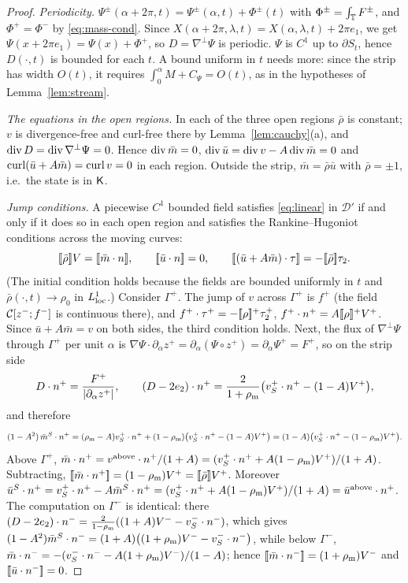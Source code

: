 \begin{proof}
\emph{Periodicity.} $\Psi^\pm(\alpha+2\pi,t)=\Psi^\pm(\alpha,t)+\Phi^\pm(t)$ with $\Phi^\pm=\int_{\mathbb{T}} F^\pm$, and $\Phi^+=\Phi^-$ by \eqref{eq:mass-cond}. Since $X(\alpha+2\pi,\lambda,t)=X(\alpha,\lambda,t)+2\pi e_1$, we get
$\Psi(x+2\pi e_1)=\Psi(x)+\Phi^+$, so $D=\nabla^\perp\Psi$ is periodic. $\Psi$ is $C^1$ up to $\partial S_t$, hence $D(\cdot,t)$ is bounded for each $t$. A bound uniform in
$t$ needs more: since the strip has width $O(t)$, it requires $\int_0^\alpha M+C_\Psi=O(t)$, as in the hypotheses of Lemma~\ref{lem:stream}.

\emph{The equations in the open regions.} In each of the three open regions $\bar\rho$ is constant; $v$ is divergence-free and curl-free there by Lemma~\ref{lem:cauchy}(a), and $\operatorname{div} D=\operatorname{div}\nabla^\perp\Psi=0$.
Hence $\operatorname{div}\bar m=0$, $\operatorname{div}\bar u=\operatorname{div} v-A\operatorname{div}\bar m=0$ and $\operatorname{curl}(\bar u+A\bar m)=\operatorname{curl} v=0$ in each region. Outside the strip, $\bar m=\bar\rho\bar u$ with $\bar\rho=\pm1$, i.e.\ the state is in $\mathsf{K}$.

\emph{Jump conditions.} A piecewise $C^1$ bounded field satisfies \eqref{eq:linear} in $\mathcal D'$ if and only if it does so in each open region and satisfies the Rankine--Hugoniot conditions across the moving curves:
\[
\jump{\bar\rho}V=\jump{\bar m\cdot n},\qquad \jump{\bar u\cdot n}=0,\qquad \jump{(\bar u+A\bar m)\cdot\tau}=-\jump{\bar\rho}\tau_2 .
\]
(The initial condition holds because the fields are bounded uniformly in $t$ and $\bar\rho(\cdot,t)\to\rho_0$ in $L^1_{\rm loc}$.) Consider $\Gamma^+$. The jump of $v$ across $\Gamma^+$ is $f^+$ (the field $\mathcal{C}[z^-;f^-]$ is
continuous there), and $f^+\cdot\tau^+=-[\![\rho]\!]^+\tau_2^+$, $f^+\cdot n^+=A[\![\rho]\!]^+V^+$. Since $\bar u+A\bar m=v$ on both sides, the third condition holds. Next, the flux of $\nabla^\perp\Psi$ through
$\Gamma^+$ per unit $\alpha$ is $\nabla\Psi\cdot\partial_\alpha z^+=\partial_\alpha(\Psi\circ z^+)=\partial_\alpha\Psi^+=F^+$, so on the strip side
\[
D\cdot n^+=\frac{F^+}{|\partial_\alpha z^+|},\qquad (D-2e_2)\cdot n^+=\frac{2}{1+\rho_{\mathrm m}}\big(v_S^+\cdot n^+-(1-A)V^+\big),
\]
and therefore
\[
(1-A^2)\,\bar m^{S}\cdot n^+=(\rho_{\mathrm m}-A)v_S^+\cdot n^++(1-\rho_{\mathrm m})\big(v_S^+\cdot n^+-(1-A)V^+\big)=(1-A)\big(v_S^+\cdot n^+-(1-\rho_{\mathrm m})V^+\big).
\]
Above $\Gamma^+$, $\bar m\cdot n^+=v^{\rm above}\cdot n^+/(1+A)=(v_S^+\cdot n^++A(1-\rho_{\mathrm m})V^+)/(1+A)$. Subtracting, $[\![\bar m\cdot n^+]\!]=(1-\rho_{\mathrm m})V^+=[\![\bar\rho]\!]V^+$. Moreover
$\bar u^S\cdot n^+=v_S^+\cdot n^+-A\bar m^S\cdot n^+=(v_S^+\cdot n^++A(1-\rho_{\mathrm m})V^+)/(1+A)=\bar u^{\rm above}\cdot n^+$. The computation on $\Gamma^-$ is identical: there
$(D-2e_2)\cdot n^-=\frac{2}{1-\rho_{\mathrm m}}((1+A)V^--v_S^-\cdot n^-)$, which gives $(1-A^2)\bar m^S\cdot n^-=(1+A)\big((1+\rho_{\mathrm m})V^--v_S^-\cdot n^-\big)$, while below $\Gamma^-$,
$\bar m\cdot n^-=-(v_S^-\cdot n^--A(1+\rho_{\mathrm m})V^-)/(1-A)$; hence $[\![\bar m\cdot n^-]\!]=(1+\rho_{\mathrm m})V^-$ and $[\![\bar u\cdot n^-]\!]=0$.
\end{proof}

